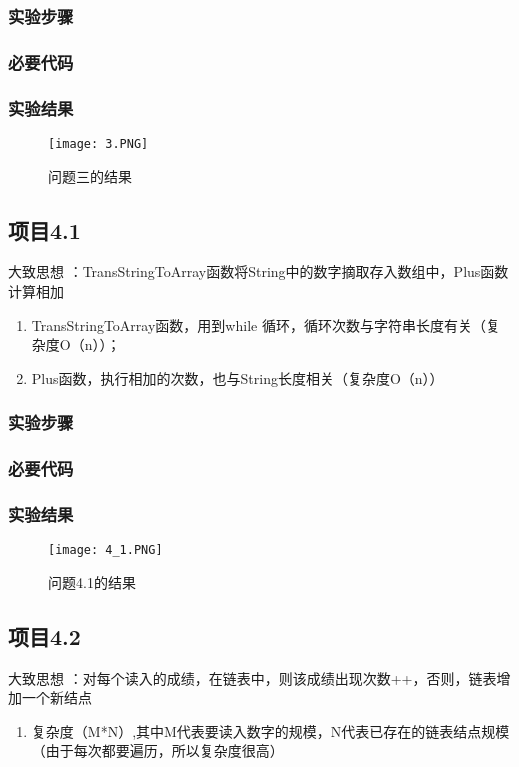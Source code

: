 \subsubsection{实验步骤}
\subsubsection{必要代码}

\subsubsection{实验结果}
	\begin{figure}[!bthp]
	\centering
        \texttt{[image: 3.PNG]}
        \caption{问题三的结果}
      \end{figure}




\subsection{项目4.1}
大致思想 ：TransStringToArray函数将String中的数字摘取存入数组中，Plus函数计算相加
\begin{enumerate}
\item TransStringToArray函数，用到while 循环，循环次数与字符串长度有关（复杂度O（n））；
\item Plus函数，执行相加的次数，也与String长度相关（复杂度O（n））
\end{enumerate}
\subsubsection{实验步骤}
\subsubsection{必要代码}

\subsubsection{实验结果}
	\begin{figure}[!bthp]
	\centering
        \texttt{[image: 4\_1.PNG]}
        \caption{问题4.1的结果}
      \end{figure}


\subsection{项目4.2}
大致思想 ：对每个读入的成绩，在链表中，则该成绩出现次数++，否则，链表增加一个新结点
\begin{enumerate}
\item 复杂度（M*N）,其中M代表要读入数字的规模，N代表已存在的链表结点规模（由于每次都要遍历，所以复杂度很高）
\end{enumerate}
